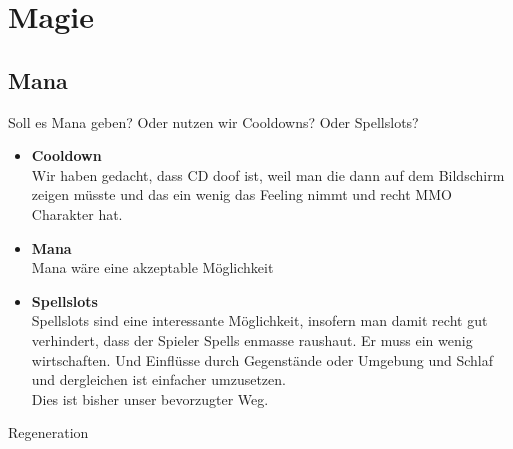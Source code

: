 \chapter{Magie}
\section{Mana}
Soll es Mana geben? Oder nutzen wir Cooldowns? Oder Spellslots?\\
\begin{itemize}
	\item \textbf{Cooldown}\\
	Wir haben gedacht, dass CD doof ist, weil man die dann auf dem Bildschirm zeigen müsste und das ein wenig das Feeling nimmt und recht MMO Charakter hat.
	\item \textbf{Mana}\\
	Mana wäre eine akzeptable Möglichkeit
	\item \textbf{Spellslots}\\
	Spellslots sind eine interessante Möglichkeit, insofern man damit recht gut verhindert, dass der Spieler Spells enmasse raushaut. Er muss ein wenig wirtschaften. Und Einflüsse durch Gegenstände oder Umgebung und Schlaf und dergleichen ist einfacher umzusetzen.\\
	Dies ist bisher unser bevorzugter Weg.
\end{itemize}
Regeneration